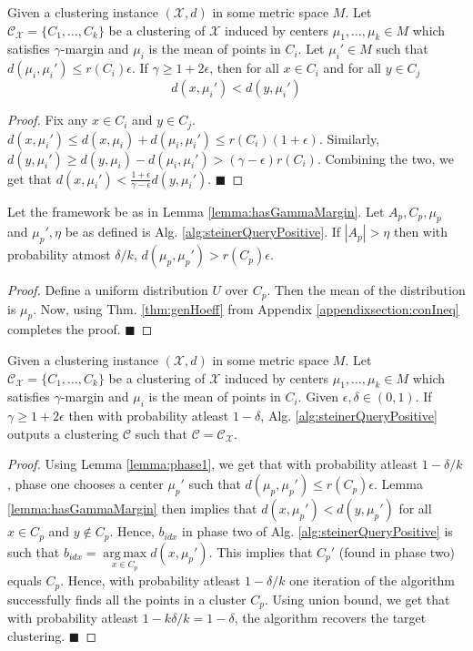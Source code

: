 \documentclass[orivec]{llncs}
\newcommand{\mc}{\mathcal}
\DeclareMathOperator*{\argmax}{arg\,max}
\renewcommand{\qed}{\hfill\ensuremath{\blacksquare}}
\begin{document}
\begin{lemma}
\label{lemma:hasGammaMargin}
Given a clustering instance $(\mc X, d)$ in some metric space $M$. Let $\mc C_{\mc X} = \{C_1, \ldots, C_k\}$ be a clustering of $\mc X$ induced by centers $\mu_1, \ldots, \mu_k \in M$ which satisfies $\gamma$-margin and $\mu_i$ is the mean of points in $C_i$. Let $\mu_i' \in M$ such that $d(\mu_i, \mu_i') \le r(C_i)\epsilon$. If $\gamma \ge 1 + 2\epsilon$, then for all $x \in C_i$ and for all $y \in C_j$
$$d(x, \mu_i') < d(y, \mu_i')$$  
\end{lemma}

\begin{proof}
Fix any $x \in C_i$ and $y \in C_j$. $d(x, \mu_i') \le d(x, \mu_i)+d(\mu_i, \mu_i') \le r(C_i) (1+\epsilon)$. Similarly, $d(y, \mu_i') \ge d(y, \mu_i) - d(\mu_i, \mu_i') > (\gamma -\epsilon)r(C_i)$. Combining the two, we get that $d(x, \mu_i') < \frac{1+\epsilon}{\gamma-\epsilon}d(y, \mu_i')$. 
\qed
\end{proof}

\begin{lemma}
\label{lemma:phase1}
Let the framework be as in Lemma \ref{lemma:hasGammaMargin}. Let $A_p, C_p, \mu_p$ and $\mu_p', \eta$ be as defined is Alg. \ref{alg:steinerQueryPositive}. If $|A_p| > \eta$ then with probability atmost $\delta/k$, $d(\mu_p, \mu_p') > r(C_p)\epsilon$.
\end{lemma}
\begin{proof}
Define a uniform distribution $U$ over $C_p$. Then the mean of the distribution is $\mu_p$. Now, using Thm. \ref{thm:genHoeff} from Appendix \ref{appendixsection:conIneq} completes the proof.
\qed
\end{proof}

\begin{theorem}
\label{thm:steinerQueryPositive}
Given a clustering instance $(\mc X, d)$ in some metric space $M$. Let $\mc C_{\mc X} = \{C_1, \ldots, C_k\}$ be a clustering of $\mc X$ induced by centers $\mu_1, \ldots, \mu_k \in M$ which satisfies $\gamma$-margin and $\mu_i$ is the mean of points in $C_i$. Given $\epsilon, \delta \in (0, 1)$. If $\gamma \ge 1 + 2\epsilon$ then with probability atleast $1-\delta$, Alg. \ref{alg:steinerQueryPositive} outputs a clustering $\mc C$ such that $\mc C = \mc C_{\mc X}$.
\end{theorem}

\begin{proof}
Using Lemma \ref{lemma:phase1}, we get that with probability atleast $1-\delta/k$, phase one chooses a center $\mu_p'$ such that $d(\mu_p, \mu_p') \le r(C_p)\epsilon$. Lemma \ref{lemma:hasGammaMargin} then implies that $d(x, \mu_p') < d(y, \mu_p')$ for all $x \in C_p$ and $y \not\in C_p$. Hence, $b_{idx}$ in phase two of Alg. \ref{alg:steinerQueryPositive} is such that $b_{idx} = \argmax\limits_{x \in C_p} d(x, \mu_p')$. This implies that $C_p'$ (found in phase two) equals $C_p$. Hence, with probability atleast $1-\delta/k$ one iteration of the algorithm successfully finds all the points in a cluster $C_p$. Using union bound, we get that with probability atleast $1-k\delta/k = 1-\delta$, the algorithm recovers the target clustering.
\qed 
\end{proof}
\end{document}
